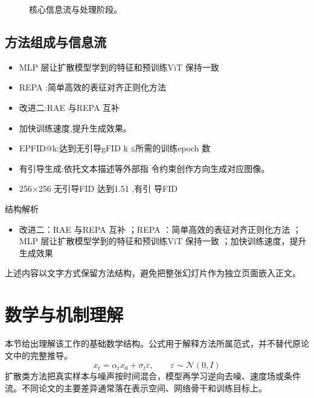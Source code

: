 \documentclass[UTF8,11pt,a4paper]{ctexart}
\begin{document}
\begin{figure}[H]
\centering
{}
\caption{核心信息流与处理阶段。}
\end{figure}

\subsection{方法组成与信息流}
\begin{itemize}
\item MLP 层让扩散模型学到的特征和预训练ViT 保持一致
\item REPA :简单高效的表征对齐正则化方法
\item 改进二:RAE 与REPA 互补
\item 加快训练速度,提升生成效果。
\item EPFID@k:达到无引导gFID k ≤所需的训练epoch 数
\item 有引导生成:依托文本描述等外部指 令约束创作方向生成对应图像。
\item 256×256 无引导FID 达到1.51 ,有引 导FID
\end{itemize}

\begin{keybox}{结构解析}
\begin{itemize}
\item 改进二：RAE 与REPA 互补 ；REPA ：简单高效的表征对齐正则化方法 ；MLP 层让扩散模型学到的特征和预训练ViT 保持一致 ；加快训练速度，提升生成效果
\end{itemize}
\end{keybox}

上述内容以文字方式保留方法结构，避免把整张幻灯片作为独立页面嵌入正文。

\section{数学与机制理解}
本节给出理解该工作的基础数学结构。公式用于解释方法所属范式，并不替代原论文中的完整推导。
\begin{equation}
x_t=\alpha_t x_0+\sigma_t\varepsilon,\qquad \varepsilon\sim\mathcal N(0,I)
\end{equation}
扩散类方法把真实样本与噪声按时间混合，模型再学习逆向去噪、速度场或条件流。不同论文的主要差异通常落在表示空间、网络骨干和训练目标上。
\end{document}
